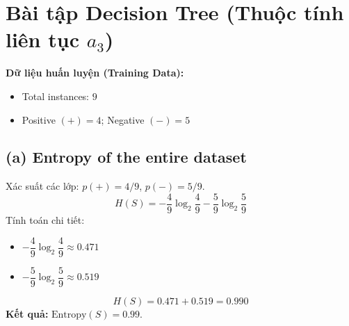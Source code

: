 \section{Bài tập Decision Tree (Thuộc tính liên tục $a_3$)}

\textbf{Dữ liệu huấn luyện (Training Data):}
\begin{itemize}
    \item Total instances: $9$
    \item Positive $(+) = 4$; Negative $(-) = 5$
\end{itemize}

\subsection*{(a) Entropy of the entire dataset}
Xác suất các lớp: $p(+) = 4/9$, $p(-) = 5/9$.
$$H(S) = -\frac{4}{9}\log_2\frac{4}{9} - \frac{5}{9}\log_2\frac{5}{9}$$
Tính toán chi tiết:
\begin{itemize}
    \item $-\dfrac{4}{9}\log_2\dfrac{4}{9} \approx 0.471$
    \item $-\dfrac{5}{9}\log_2\dfrac{5}{9} \approx 0.519$
\end{itemize}
$$H(S) = 0.471 + 0.519 = 0.990$$
\textbf{Kết quả:} $\text{Entropy}(S) = 0.99$.

